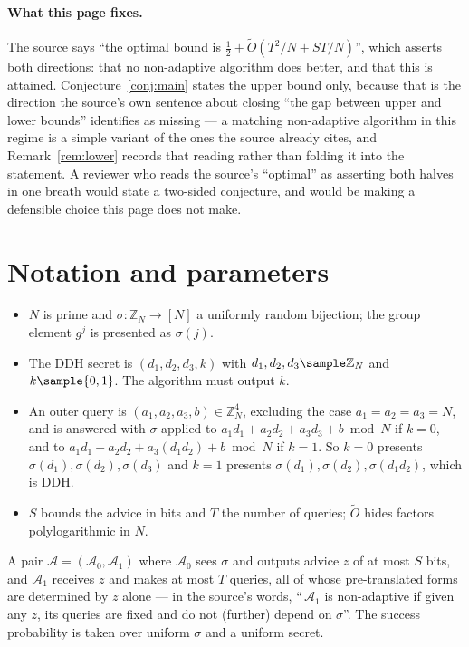 \documentclass{conjura-conjecture}
\newcommand{\Adv}{\mathcal{A}}
\newcommand{\Z}{\mathbb{Z}}
\newcommand{\Ot}{\widetilde{O}}
\newcommand{\bits}{\{0,1\}}
\begin{document}
\paragraph{What this page fixes.}
The source says ``the optimal bound is $\tfrac{1}{2} + \Ot(T^{2}/N +
ST/N)$'', which asserts both directions: that no non-adaptive algorithm
does better, and that this is attained. Conjecture~\ref{conj:main}
states the upper bound only, because that is the direction the source's
own sentence about closing ``the gap between upper and lower bounds''
identifies as missing --- a matching non-adaptive algorithm in this
regime is a simple variant of the ones the source already cites, and
Remark~\ref{rem:lower} records that reading rather than folding it into
the statement. A reviewer who reads the source's ``optimal'' as
asserting both halves in one breath would state a two-sided conjecture,
and would be making a defensible choice this page does not make.

\section{Notation and parameters}\label{sec:notation}

\begin{itemize}[nosep]
  \item $N$ is prime and $\sigma : \Z_{N} \to [N]$ a uniformly random
    bijection; the group element $g^{j}$ is presented as $\sigma(j)$.
  \item The DDH secret is $(d_{1}, d_{2}, d_{3}, k)$ with
    $d_{1}, d_{2}, d_{3} \sample \Z_{N}$ and $k \sample \bits$. The
    algorithm must output $k$.
  \item An outer query is $(a_{1}, a_{2}, a_{3}, b) \in \Z_{N}^{4}$,
    excluding the case $a_{1} = a_{2} = a_{3} = N$, and is answered
    with $\sigma$ applied to
    $a_{1} d_{1} + a_{2} d_{2} + a_{3} d_{3} + b \bmod N$ if $k = 0$,
    and to
    $a_{1} d_{1} + a_{2} d_{2} + a_{3} (d_{1} d_{2}) + b \bmod N$ if
    $k = 1$. So $k = 0$ presents
    $\sigma(d_{1}), \sigma(d_{2}), \sigma(d_{3})$ and $k = 1$ presents
    $\sigma(d_{1}), \sigma(d_{2}), \sigma(d_{1} d_{2})$, which is DDH\@.
  \item $S$ bounds the advice in bits and $T$ the number of queries;
    $\Ot$ hides factors polylogarithmic in $N$.
\end{itemize}

\begin{definition}\label{def:na}
A pair $\Adv = (\Adv_{0}, \Adv_{1})$ where $\Adv_{0}$ sees $\sigma$ and
outputs advice $z$ of at most $S$ bits, and $\Adv_{1}$ receives $z$ and
makes at most $T$ queries, all of whose pre-translated forms are
determined by $z$ alone --- in the source's words, ``\,$\Adv_{1}$ is
non-adaptive if given any $z$, its queries are fixed and do not
(further) depend on $\sigma$''. The success probability is taken over
uniform $\sigma$ and a uniform secret.
\end{definition}
\end{document}

